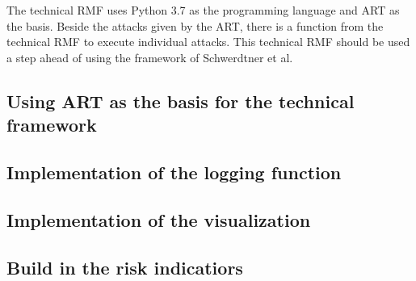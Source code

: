 The technical RMF uses Python 3.7 as the programming language and ART as the basis. Beside the attacks given by the ART, there is a function from the technical RMF to execute individual attacks. This technical RMF should be used a step ahead of using the framework of Schwerdtner et al.

\subsection{Using ART as the basis for the technical framework}

\subsection{Implementation of the logging function}

\subsection{Implementation of the visualization}

\subsection{Build in the risk indicatiors}

